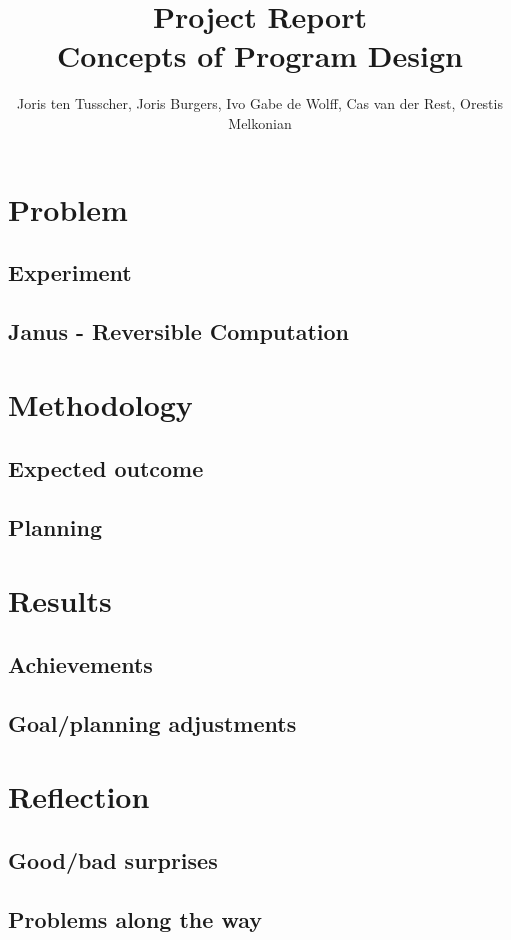 \documentclass[12pt,a4paper]{article}
\title{\textbf{Project Report \\ \small{Concepts of Program Design}}}
\author{\small{Joris ten Tusscher, Joris Burgers, Ivo Gabe de Wolff, Cas van der Rest, Orestis Melkonian}}
\date{}
\begin{document}
\maketitle

\section{Problem}
    \subsection{Experiment}
    \subsection{Janus - Reversible Computation}
\section{Methodology}
	\subsection{Expected outcome}
	\subsection{Planning}
\section{Results}
	\subsection{Achievements}
	\subsection{Goal/planning adjustments}
\section{Reflection}
	\subsection{Good/bad surprises}
	\subsection{Problems along the way}
\end{document}
